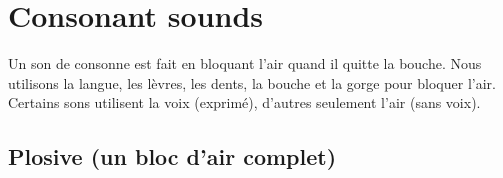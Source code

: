 \chapter{Consonant sounds}\label{chap:conson}


Un son de consonne est fait en bloquant l'air quand il quitte la
bouche. Nous utilisons la langue, les lèvres, les dents, la bouche et
la gorge pour bloquer l'air. Certains sons utilisent la voix
(exprimé), d'autres seulement l'air (sans voix).

\newpage
\minitoc
\newpage

\section{Plosive (un bloc d'air complet)}\label{sec:plosive}




\subsection{ }\label{subsec:p}

